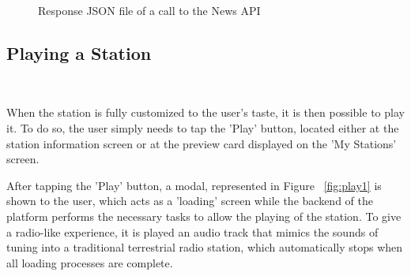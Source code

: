 \begin{figure}[h]
\centering
{}
\caption{Response JSON file of a call to the News API}
\label{fig:mys}
\end{figure}

\newpage
\subsection{Playing a Station}
~\label{subs:playing}

When the station is fully customized to the user's taste, it is then possible to play it. To do so, the user simply needs to tap the 'Play' button, located either at the station information screen or at the preview card displayed on the 'My Stations' screen. 

After tapping the 'Play' button, a modal, represented in Figure ~\ref{fig:play1} is shown to the user, which acts as a 'loading' screen while the backend of the platform performs the necessary tasks to allow the playing of the station. To give a radio-like experience, it is played an audio track that mimics the sounds of tuning into a traditional terrestrial radio station, which automatically stops when all loading processes are complete. 

